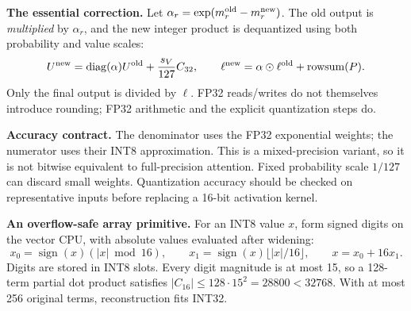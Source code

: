 \documentclass[11pt]{article}
\newcommand{\rsum}{\operatorname{rowsum}}
\begin{document}
\textbf{The essential correction.} Let $\alpha_r=\exp(m_r^{\rm old}-m_r^{\rm new})$.
The old output is \emph{multiplied} by $\alpha_r$, and the new integer product is
dequantized using both probability and value scales:
\[
 U^{\rm new}=\operatorname{diag}(\alpha)U^{\rm old}
       +\frac{s_V}{127}C_{32},\qquad
 \ell^{\rm new}=\alpha\odot\ell^{\rm old}+\rsum(P).
\]
Only the final output is divided by $\ell$. FP32 reads/writes do not themselves
introduce rounding; FP32 arithmetic and the explicit quantization steps do.

\textbf{Accuracy contract.} The denominator uses the FP32 exponential weights;
the numerator uses their INT8 approximation. This is a mixed-precision variant,
so it is not bitwise equivalent to full-precision attention. Fixed probability
scale $1/127$ can discard small weights. Quantization accuracy should be checked
on representative inputs before replacing a 16-bit activation kernel.

\clearpage
\textbf{An overflow-safe array primitive.}
For an INT8 value $x$, form signed digits on the vector CPU, with absolute values
evaluated after widening:
\[
 x_0=\operatorname{sign}(x)(|x|\bmod16),\qquad
 x_1=\operatorname{sign}(x)\lfloor|x|/16\rfloor,
 \qquad x=x_0+16x_1.
\]
Digits are stored in INT8 slots. Every digit magnitude is at most 15, so a
128-term partial dot product satisfies $|C_{16}|\le128\cdot15^2=28800<32768$.
With at most 256 original terms, reconstruction fits INT32.
\end{document}
